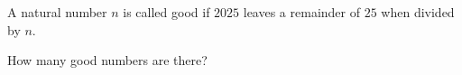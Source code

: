 A natural number $n$ is called good if $2025$ leaves a remainder of $25$ when divided by $n$.



How many good numbers are there?
